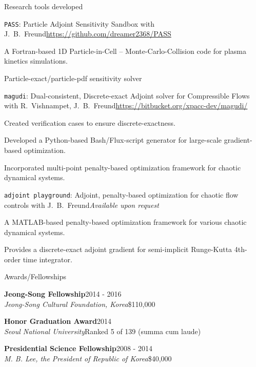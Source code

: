 \documentclass{resume} %
\begin{document}
\begin{rSection}{Research tools developed}
\begin{rSubsection}{\texttt{PASS}: Particle Adjoint Sensitivity Sandbox}{}
{with J.\ B.\ Freund}{\url{https://github.com/dreamer2368/PASS}}
\item A Fortran-based 1D Particle-in-Cell -- Monte-Carlo-Collision code for plasma kinetics simulations.
\item Particle-exact/particle-pdf sensitivity solver
\end{rSubsection}
\begin{rSubsection}{\texttt{magudi}: Dual-consistent, Discrete-exact Adjoint solver for Compressible Flows}{}
{with R.\ Vishnampet, J.\ B.\ Freund}{\url{https://bitbucket.org/xpacc-dev/magudi/}}
\item Created verification cases to ensure discrete-exactness.
\item Developed a Python-based Bash/Flux-script generator for large-scale gradient-based optimization.
\item Incorporated multi-point penalty-based optimization framework for chaotic dynamical systems.
\end{rSubsection}
\begin{rSubsection}{\texttt{adjoint playground}: Adjoint, penalty-based optimization for chaotic flow controls}{}
{with J.\ B.\ Freund}{\em Available upon request}
\item A MATLAB-based penalty-based optimization framework for various chaotic dynamical systems.
\item Provides a discrete-exact adjoint gradient for semi-implicit Runge-Kutta 4th-order time integrator.
\end{rSubsection}
\end{rSection}



\begin{rSection}{Awards/Fellowships}

{\bf Jeong-Song Fellowship}\hfill 2014 - 2016\\
{\it Jeong-Song Cultural Foundation, Korea}\hfill \$110,000

{\bf Honor Graduation Award}\hfill 2014\\
{\it Seoul National University}\hfill Ranked 5 of 139 (summa cum laude)

{\bf Presidential Science Fellowship}\hfill 2008 - 2014\\
{\it M. B. Lee, the President of Republic of Korea}\hfill \$40,000

\end{rSection}
\end{document}
